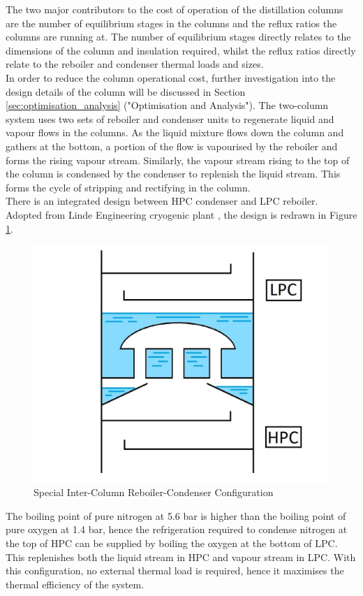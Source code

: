         The two major contributors to the cost of operation of the distillation columns are the number of equilibrium stages in the columns and the reflux ratios the columns are running at. The number of equilibrium stages directly relates to the dimensions of the column and insulation required, whilst the reflux ratios directly relate to the reboiler and condenser thermal loads and sizes. \\
        In order to reduce the column operational cost, further investigation into the design details of the column will be discussed in Section \ref{sec:optimisation_analysis} ("Optimisation and Analysis").
		 \label{sec:column_reb_cond} 
		The two-column system uses two sets of reboiler and condenser units to regenerate liquid and vapour flows in the columns. As the liquid mixture flows down the column and gathers at the bottom, a portion of the flow is vapourised by the reboiler and forms the rising vapour stream. Similarly, the vapour stream rising to the top of the column is condensed by the condenser to replenish the liquid stream. This forms the cycle of stripping and rectifying in the column. \\
		
	    \noindent There is an integrated design between HPC condenser and LPC reboiler. Adopted from Linde Engineering cryogenic plant \citep{linde_cryo}, the design is redrawn in Figure \ref{reboiler-condenser_diagram}. \\
		\begin{figure}[H]
		    \centering
		    \includegraphics[scale=0.3]{airseparation/graphics/reboiler-condenser_diagram.jpg}
		    \caption{Special Inter-Column Reboiler-Condenser Configuration}
		    \label{reboiler-condenser_diagram}
		\end{figure}
	    \noindent The boiling point of pure nitrogen at 5.6 bar is higher than the boiling point of pure oxygen at 1.4 bar, hence the refrigeration required to condense nitrogen at the top of HPC can be supplied by boiling the oxygen at the bottom of LPC. This replenishes both the liquid stream in HPC and vapour stream in LPC. With this configuration, no external thermal load is required, hence it maximises the thermal efficiency of the system. \\
